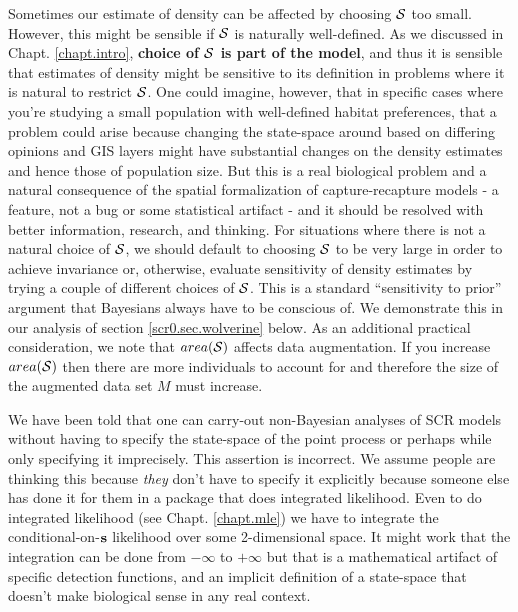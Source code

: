 Sometimes
our estimate of density can be affected by choosing ${\cal S}$ too
small. However, 
this might be sensible if ${\cal S}$ is naturally well-defined. As we discussed
in Chapt. \ref{chapt.intro}, {\bf choice of ${\cal S}$ is part of the
  model}, and thus it is sensible 
that estimates of density might be sensitive to its definition
  in problems where it is natural to restrict ${\cal S}$.
One could imagine,
however, that in specific cases where you're studying a small
population with well-defined habitat preferences, that a problem could
arise because changing the state-space around based on differing
opinions and GIS layers might have substantial changes on the density
estimates and hence those of 
population size. But this is a real biological problem and a natural
consequence of the spatial formalization of capture-recapture models -
a feature, not a bug or some statistical artifact - and it should be
resolved with better information, research, and thinking.
 For situations where there is not a natural
choice of ${\cal S}$, we should default to choosing ${\cal S}$ to be very large in order
to achieve invariance or, otherwise, evaluate sensitivity of density
estimates by trying a couple of different choices of ${\cal S}$. This is a
standard ``sensitivity to prior'' argument that Bayesians always have
to be conscious of.  We demonstrate this in our analysis of section
\ref{scr0.sec.wolverine}
below. As an additional practical 
consideration, we note that $area({\cal S})$ affects data augmentation. If you
increase $area({\cal S})$ then there are more individuals to account for and
therefore the size of the augmented data set $M$ must increase.

We have been told that one can carry-out non-Bayesian analyses of SCR
models without having to specify the state-space of the point process
or perhaps while only specifying it imprecisely.  This assertion is
incorrect. We assume people are thinking this because {\it they} don't
have to specify it explicitly because someone else has done it for
them in a package that does integrated likelihood. Even to do
integrated likelihood (see Chapt. \ref{chapt.mle}) we have to integrate the
conditional-on-${\bf s}$ likelihood over some 2-dimensional space.  It might
work that the integration can be done from $-\infty$ to $+\infty$ but
that is a mathematical artifact of specific detection functions, and
an implicit definition of a state-space that doesn't make biological
sense in any real context. %


